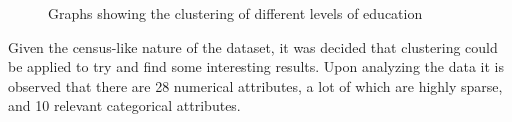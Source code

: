 \begin{figure}[t]
    \centering
    \quad
    \caption{Graphs showing the clustering of different levels of education}
    \label{cluster1_graphs}
\end{figure}

Given the census-like nature of the dataset, it was decided that clustering could be applied to try and find some interesting results. Upon analyzing the data it is observed that there are 28 numerical attributes, a lot of which are highly sparse, and 10 relevant categorical attributes. 

